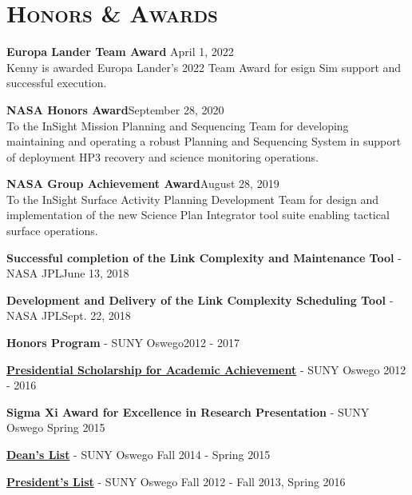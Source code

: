 \documentclass[8pt]{article}
\renewenvironment{itemize}{
  \begin{list}{}{
    \setlength{\leftmargin}{1.5em}
  }
}{
  \end{list}
}
\begin{document}
\section*{\textsc{Honors \& Awards}}

\begin{itemize}

\item \textbf{Europa Lander Team Award} \hfill April 1, 2022\\
Kenny is awarded Europa Lander's 2022 Team Award for esign Sim support and successful execution.

\item \textbf{NASA Honors Award}\hfill September 28, 2020\\
To the InSight Mission Planning and Sequencing Team for developing maintaining and operating a robust Planning and Sequencing System in support of deployment HP3 recovery and science monitoring operations.

\item \textbf{NASA Group Achievement Award}\hfill August 28, 2019\\
To the InSight Surface Activity Planning Development Team for design and implementation of the new Science Plan Integrator tool suite enabling tactical surface operations.

\item \textbf{Successful completion of the Link Complexity and Maintenance Tool}
- NASA JPL\hfill June 13, 2018

\item \textbf{Development and Delivery of the Link Complexity Scheduling Tool} - NASA JPL\hfill Sept. 22, 2018

\item \textbf{Honors Program} - SUNY Oswego\hfill 2012 - 2017

\item \textbf{\href{http://oswegocountytoday.com/local-residents-receive-suny-oswego-scholarships/}{Presidential Scholarship for Academic Achievement}} - SUNY Oswego  \hfill 2012 - 2016

\item \textbf{Sigma Xi Award for Excellence in Research Presentation} - SUNY Oswego \hfill Spring 2015

\item \textbf{\href{http://meritpages.com/Kroffo}{Dean's List}} - SUNY Oswego \hfill Fall 2014 - Spring 2015

\item \textbf{\href{http://meritpages.com/Kroffo}{President's List}} - SUNY Oswego \hfill Fall 2012 - Fall 2013, Spring 2016


\end{itemize}
\end{document}
